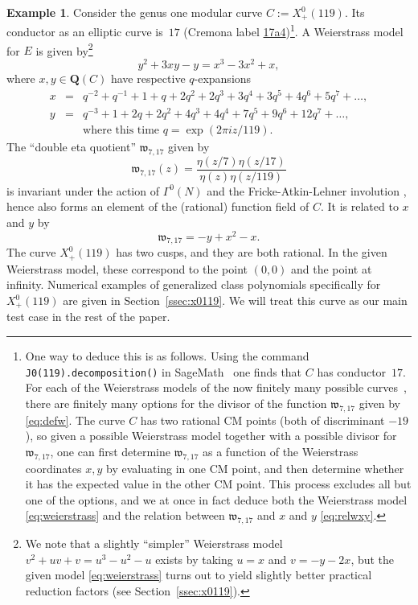 \documentclass{amsart}
\newcommand{\QQ}{\mathbf{Q}}
\newcommand{\xplus}[1]{X^0_+(#1)}
\numberwithin{equation}{section}
\theoremstyle{definition}
\newtheorem{example}[equation]{Example}
\begin{document}
\begin{example}\label{example:main}
Consider the genus one modular curve $C:=\xplus{119}$.
Its conductor as an elliptic curve is~$17$
(Cremona label \href{https://www.lmfdb.org/EllipticCurve/Q/17/a/4}{17a4})\footnote{One way to deduce this is as follows.
	Using the command \texttt{J0(119).decomposition()} in SageMath~\cite{sage}
	one finds that $C$ has conductor~$17$.
	For each of the Weierstrass models of the now finitely many possible curves~\cite{lmfdb},
	there are finitely many options for the divisor of the function $\mathfrak{w}_{7,17}$
	given by \eqref{eq:defw}. The curve $C$ has two rational CM points
	(both of discriminant $-19$), so given a possible Weierstrass model
	together with a possible divisor for $\mathfrak{w}_{7,17}$, one
	can first determine $\mathfrak{w}_{7,17}$ as a function of the
	Weierstrass coordinates $x,y$ by evaluating in one CM point, and then determine whether it has the expected value in the other CM point. This process excludes all but one of the options, and we at once in fact deduce both the Weierstrass model \eqref{eq:weierstrass} and the relation between $\mathfrak{w}_{7,17}$ and $x$ and $y$ \eqref{eq:relwxy}.}.
A Weierstrass model for $E$ is given by\footnote{We note that a slightly ``simpler'' Weierstrass model $v^2+uv+v=u^3-u^2-u$ exists by taking $u=x$ and $v=-y-2x$, but the given model \eqref{eq:weierstrass} turns out to yield slightly better practical reduction factors (see Section~\ref{ssec:x0119}).}
\begin{equation}\label{eq:weierstrass}
y^2+3xy-y=x^3-3x^2+x,
\end{equation}
where $x,y\in\QQ(C)$ have respective $q$-expansions
\begin{eqnarray*}
x &=& q^{-2} + q^{-1} + 1 + q + 2q^2 + 2q^3 + 3q^4 + 3q^5 + 4q^6 + 5q^7 + \ldots,\\
y &=& q^{-3} + 1 + 2q + 2q^2 + 4q^3 + 4q^4 + 7q^5 + 9q^6 + 12q^7 +\ldots,\\
& & \mbox{where this time $q = \exp(2\pi i z/119)$.}
\end{eqnarray*}
The ``double eta quotient'' $\mathfrak{w}_{7,17}$ given by
\begin{equation}\label{eq:defw}
\mathfrak{w}_{7,17}(z)
=\frac{\eta(z/7)\eta(z/17)}{\eta(z)\eta(z/119)}
\end{equation}
is invariant under the action of $\Gamma^0(N)$ \cite[Thm.\ 1]{newman1}
and the Fricke-Atkin-Lehner involution \cite[Thm.\ 2]{enge-schertz2005}, hence also forms an element of the (rational) function field of $C$. It is related to $x$ and $y$ by
\begin{equation}\label{eq:relwxy}
\mathfrak{w}_{7,17}=-y+x^2-x.
\end{equation}
The curve $\xplus{119}$ has two cusps, and they are both rational.
In the given Weierstrass model,
these correspond to the point $(0,0)$ and the point at infinity.
Numerical examples of generalized class polynomials specifically for $\xplus{119}$ are given in Section~\ref{ssec:x0119}.
We will treat this curve as our main test case in the rest of the paper.
\end{example}
		
\end{document}
